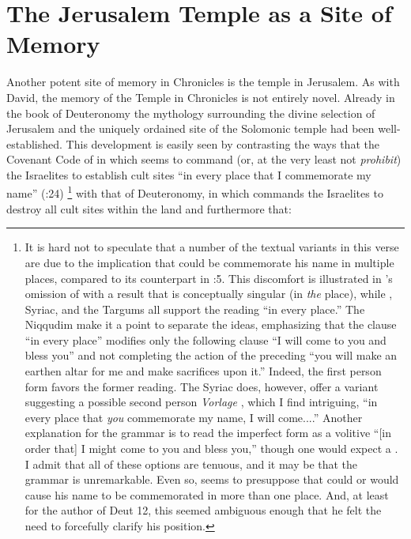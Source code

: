 
\section{The Jerusalem Temple as a Site of Memory}
Another potent site of memory in Chronicles is the temple in Jerusalem. As with David, the memory of the Temple in Chronicles is not entirely novel. Already in the book of Deuteronomy the mythology surrounding the divine selection of Jerusalem and the uniquely ordained site of the Solomonic temple had been well-established. This development is easily seen by contrasting the ways that the Covenant Code of  in which \yahweh seems to command (or, at the very least not \emph{prohibit}) the Israelites to establish cult sites  ``in every place that I commemorate my name'' (:24)%
    \footnote{It is hard not to speculate that a number of the textual variants in this verse are due to the implication that \yahweh could be commemorate his name in multiple places, compared to its counterpart in :5. This discomfort is illustrated in  \sampent's omission of  with a result that  is conceptually singular (in \emph{the} place), while \lxx, Syriac, and the Targums all support the reading ``in every place.'' The Niqqudim make it a point to separate the ideas, emphasizing that the clause  ``in every place'' modifies only the following clause  ``I will come to you and bless you'' and not completing the action of the preceding  ``you will make an earthen altar for me and make sacrifices upon it.'' Indeed, the first person form  favors the former reading. The Syriac does, however, offer a variant suggesting a possible second person \emph{Vorlage} , which I find intriguing, ``in every place that \emph{you} commemorate my name, I will come....'' Another explanation for the grammar is to read the imperfect form  as a volitive ``[in order that] I might come to you and bless you,'' though one would expect a . I admit that all of these options are tenuous, and it may be that the grammar is unremarkable. Even so,  seems to presuppose that \yahweh could or would cause his name to be commemorated in more than one place. And, at least for the author of Deut 12, this seemed ambiguous enough that he felt the need to forcefully clarify his position.}
with that of Deuteronomy, in which \yahweh commands the Israelites to destroy all cult sites within the land and furthermore that: 

